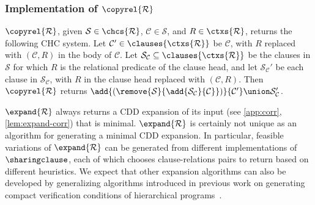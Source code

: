 \subsubsection{Implementation of $\copyrel{ \mathcal{R} }$}
%
$\copyrel{\mathcal{R}}$, given $\mathcal{S} \in \chcs{ \mathcal{R} }$,
$\mathcal{C} \in \mathcal{S}$, and $R \in \ctxs{ \mathcal{R} }$,
returns the following CHC system.
Let $\mathcal{C}' \in \clauses{ \ctxs{ \mathcal{R} } }$ be
$\mathcal{C}$, with $R$ replaced with $(\mathcal{C}, R)$ in the body
of $\mathcal{C}$.
%
Let $\mathcal{S}_{ \mathcal{C} } \subseteq \clauses{ \ctxs{
    \mathcal{R} } }$ be the clauses in $\mathcal{S}$ for which $R$ is
the relational predicate of the clause head, and let
$\mathcal{S}_{\mathcal{C}}'$ be each clause in $\mathcal{S}_{
  \mathcal{C} }$, with $R$ in the clause head replaced with
$(\mathcal{C}, R)$.
%
Then $\copyrel{ \mathcal{R} }$ returns $\add{ (\remove{ \mathcal{S} }{
    \add{ \mathcal{S}_{\mathcal{C}} }{\mathcal{C} } }) }{ \mathcal{C}'
} \union \mathcal{S}_{\mathcal{C}}'$.
%  

$\expand{\mathcal{R}}$ always returns a CDD expansion of its input
(see \autoref{app:corr}, \autoref{lem:expand-corr}) that is minimal.
$\expand{ \mathcal{R} }$ is certainly not unique as an algorithm for
generating a minimal CDD expansion.
%
In particular, feasible variations of $\expand{ \mathcal{R} }$ can be
generated from different implementations of $\sharingclause$, each of
which chooses clause-relations pairs to return based on different
heuristics.
%
We expect that other expansion algorithms can also be developed by
generalizing algorithms introduced in previous work on generating
compact verification conditions of hierarchical
programs~\cite{lal-qadeer15}.

